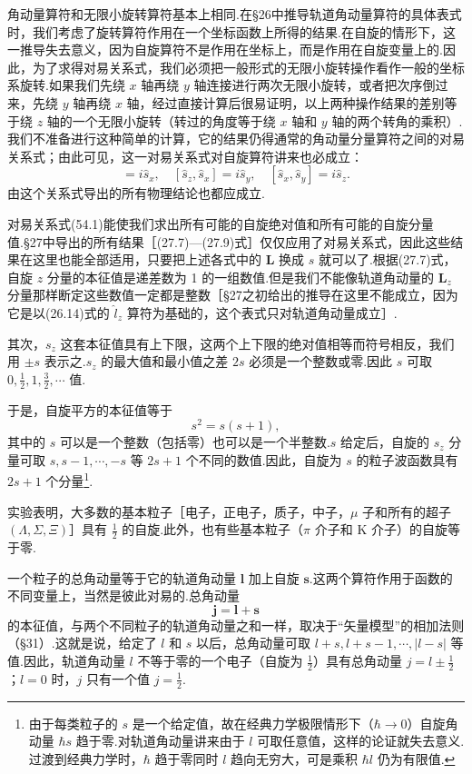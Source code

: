 角动量算符和无限小旋转算符基本上相同.在§26中推导轨道角动量算符的具体表式时，我们考虑了旋转算符作用在一个坐标函数上所得的结果.在自旋的情形下，这一推导失去意义，因为自旋算符不是作用在坐标上，而是作用在自旋变量上的.因此，为了求得对易关系式，我们必须把一般形式的无限小旋转操作看作一般的坐标系旋转.如果我们先绕 $x$ 轴再绕 $y$ 轴连接进行两次无限小旋转，或者把次序倒过来，先绕 $y$ 轴再绕 $x$ 轴，经过直接计算后很易证明，以上两种操作结果的差别等于绕 $z$ 轴的一个无限小旋转（转过的角度等于绕 $x$ 轴和 $y$ 轴的两个转角的乘积）.我们不准备进行这种简单的计算，它的结果仍得通常的角动量分量算符之间的对易关系式；由此可见，这一对易关系式对自旋算符讲来也必成立：
\begin{equation}
  [\hat{s}_y,\hat{s}_z]=i\hat{s}_x,\quad
  [\hat{s}_z,\hat{s}_x]=i\hat{s}_y,\quad
  [\hat{s}_x,\hat{s}_y]=i\hat{s}_z.
\end{equation}
由这个关系式导出的所有物理结论也都应成立.

对易关系式(54.1)能使我们求出所有可能的自旋绝对值和所有可能的自旋分量值.§27中导出的所有结果［(27.7)—(27.9)式］仅仅应用了对易关系式，因此这些结果在这里也能全部适用，只要把上述各式中的 $\boldsymbol{L}$ 换成 $s$ 就可以了.根据(27.7)式，自旋 $z$ 分量的本征值是递差数为 1 的一组数值.但是我们不能像轨道角动量的 $\boldsymbol{L}_z$ 分量那样断定这些数值一定都是整数［§27之初给出的推导在这里不能成立，因为它是以(26.14)式的 $\hat{l}_z$ 算符为基础的，这个表式只对轨道角动量成立］.

其次，$s_z$ 这套本征值具有上下限，这两个上下限的绝对值相等而符号相反，我们用 $\pm s$ 表示之.$s_z$ 的最大值和最小值之差 $2s$ 必须是一个整数或零.因此 $s$ 可取 $0,\frac{1}{2},1,\frac{3}{2},\cdots$ 值.

于是，自旋平方的本征值等于
\begin{equation}
  s^2=s(s+1),
\end{equation}
其中的 $s$ 可以是一个整数（包括零）也可以是一个半整数.$s$ 给定后，自旋的 $s_z$ 分量可取 $s,s-1,\cdots,-s$ 等 $2s+1$ 个不同的数值.因此，自旋为 $s$ 的粒子波函数具有 $2s+1$ 个分量\footnote{由于每类粒子的 $s$ 是一个给定值，故在经典力学极限情形下（$\hbar\to0$）自旋角动量 $\hbar s$ 趋于零.对轨道角动量讲来由于 $l$ 可取任意值，这样的论证就失去意义.过渡到经典力学时，$\hbar$ 趋于零同时 $l$ 趋向无穷大，可是乘积 $\hbar l$ 仍为有限值.}.

实验表明，大多数的基本粒子［电子，正电子，质子，中子，$\mu$ 子和所有的超子 $(\Lambda,\Sigma,\Xi)$］具有 $\frac{1}{2}$ 的自旋.此外，也有些基本粒子（$\pi$ 介子和 K 介子）的自旋等于零.

一个粒子的总角动量等于它的轨道角动量 $\boldsymbol{l}$ 加上自旋 $\boldsymbol{s}$.这两个算符作用于函数的不同变量上，当然是彼此对易的.总角动量
\begin{equation}
  \boldsymbol{j}=\boldsymbol{l}+\boldsymbol{s}
\end{equation}
的本征值，与两个不同粒子的轨道角动量之和一样，取决于“矢量模型”的相加法则（§31）.这就是说，给定了 $l$ 和 $s$ 以后，总角动量可取 $l+s,l+s-1,\cdots,|l-s|$ 等值.因此，轨道角动量 $l$ 不等于零的一个电子（自旋为 $\frac{1}{2}$）具有总角动量 $j=l\pm\frac{1}{2}$；$l=0$ 时，$j$ 只有一个值 $j=\frac{1}{2}$.

